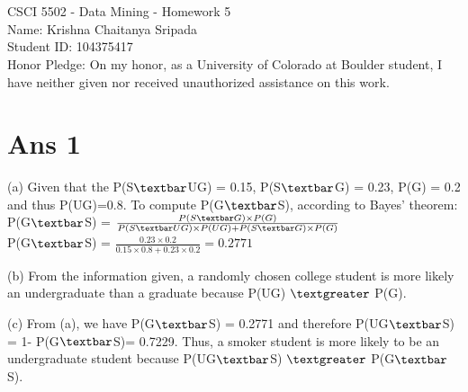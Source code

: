 \documentclass[10pt]{article}
\begin{document}
\section*{}
\begin{flushleft}
CSCI 5502 - Data Mining - Homework 5\\
Name: Krishna Chaitanya Sripada\\
Student ID: 104375417\\
Honor Pledge: On my honor, as a University of Colorado at Boulder student, I have neither given nor received unauthorized assistance on this work.
\end{flushleft}
\section*{Ans 1}
\begin{flushleft}
(a) Given that the P(S$\textbar$UG) = 0.15, P(S$\textbar$G) = 0.23, P(G) = 0.2 and thus P(UG)=0.8. To compute P(G$\textbar$S), according to Bayes' theorem:\\
\vspace{0.5em}
\hspace{2em} P(G$\textbar$S) = $\frac{P(S\textbar G) \times P(G)}{P(S\textbar UG) \times P(UG) +P(S\textbar G) \times P(G)}$\\
\vspace{0.5em}
\hspace{2em} P(G$\textbar$S) = $\frac{0.23 \times 0.2}{0.15 \times 0.8 + 0.23 \times 0.2} = 0.2771$\\
\end{flushleft}
\begin{flushleft}
(b) From the information given, a randomly chosen college student is more likely an undergraduate than a graduate because P(UG) $\textgreater$ P(G).\\
\end{flushleft}
\begin{flushleft}
(c) From (a), we have P(G$\textbar$S) = 0.2771 and therefore P(UG$\textbar$S) = 1- P(G$\textbar$S)= 0.7229. Thus, a smoker student is more likely to be an undergraduate student because P(UG$\textbar$S) $\textgreater$ P(G$\textbar$S).\\
\end{flushleft}
\end{document}
